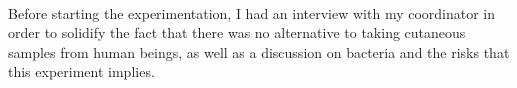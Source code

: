 \paragraph{}Before starting the experimentation, I had an interview with my coordinator in order to solidify the fact that there was no alternative to taking cutaneous samples from human beings, as well as a discussion on bacteria and the risks that this experiment implies.